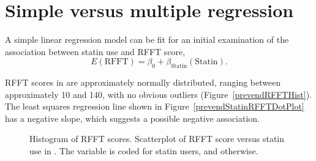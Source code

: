 \section{Simple versus multiple regression}
\label{simpleVsMultipleRegression}

A simple linear regression model can be fit for an initial examination of the association between statin use and RFFT score,
\[
E(\text{RFFT}) = \beta_0 + \beta_{\text{Statin}}(\text{Statin}).
\label{RFFTStatinModel}
\]

RFFT scores in  are approximately normally distributed, ranging between approximately 10 and 140, with no obvious outliers (Figure~\ref{prevendRFFTHist}). The least squares regression line shown in Figure~\ref{prevendStatinRFFTDotPlot} has a negative slope, which suggests a possible negative association. 

\begin{figure}[ht]
	\centering
	\caption{ Histogram of RFFT scores.  Scatterplot of RFFT score versus statin use in . The variable  is coded  for statin users, and  otherwise.}
	\label{prevendStatinRFFTPlot}
\end{figure}

